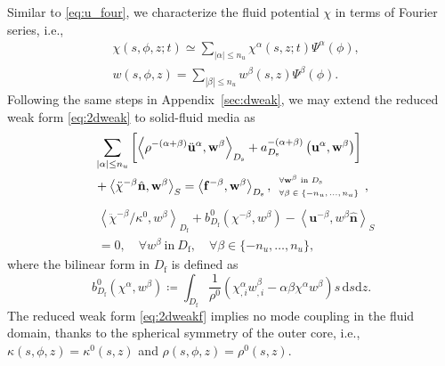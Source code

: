 \documentclass[extra]{gji}
\begin{document}
Similar to \eqref{eq:u_four}, we characterize the fluid potential $\chi$
in terms of Fourier series, i.e.,
\begin{align}
  &\chi\left(s,\phi,z;t\right) \simeq \sum_{|\alpha|\le n_u} 
  \chi^\alpha\left(s,z;t\right)\Psi^\alpha\left(\phi\right),\\[.5em]
  &w\left(s,\phi,z\right) =\sum_{|\beta|\le n_u} 
  w^\beta\left(s,z\right)\Psi^\beta\left(\phi\right).
\end{align}
Following the same steps in Appendix~\ref{sec:dweak}, we may extend 
the reduced weak form \eqref{eq:2dweak} to solid-fluid media as
\begin{equation}
  \begin{alignedat}{1}
    &\sum_{|\alpha|\le n_u} \left[ 
    \left\langle \rho^{-\left(\alpha+\beta\right)}
    \ddot{\mathbf{u}}^\alpha,\mathbf{w}^\beta \right\rangle _{D_\text{s}}
    + a_{D_\text{s}}^{-\left(\alpha+\beta\right)}
    \left(\mathbf{u}^\alpha,\mathbf{w}^\beta\right)\right] \\
    &+\left\langle \ddot{\chi}^{-\beta}\hat{\mathbf{n}},
    \mathbf{w}^\beta \right\rangle _{S}
    =\left\langle \mathbf{f}^{-\beta},\mathbf{w}^\beta \right\rangle 
    _{D_\text{s}}, 
    {\scriptsize
    \begin{array}{l}
      \forall \mathbf{w}^\beta\ \text{in}\ D_\text{s} \\[.3em]
      \forall \beta\in \{-n_u,...,n_u\}
    \end{array}
    },
  \end{alignedat}
\end{equation}
\begin{equation}
  \begin{alignedat}{1}
    & \left\langle 
    \ddot{\chi}^{-\beta}\Big/\kappa^{0}, w^\beta
    \right\rangle _{D_\text{f}}
    + b^0_{D_\text{f}}
    \left(\chi^{-\beta},w^\beta\right) 
    -\left\langle \mathbf{u}^{-\beta}, w^\beta \hat{\mathbf{n}}
    \right\rangle _{S}
    \\&=0, \quad \forall w^\beta\ \text{in}\ D_\text{f},
    \quad \forall \beta\in \{-n_u,\dots,n_u\},
  \end{alignedat}
  \label{eq:2dweakf}
\end{equation}
where the bilinear form in $D_\text{f}$ is defined as
\begin{equation}
  b^0_{D_\text{f}}\left(\chi^{\alpha},w^\beta\right) \coloneqq
  \int_{D_\text{f}} \frac{1}{\rho^0}
  \left(\chi^{\alpha}_{,i} w^{\beta}_{,i} -
  \alpha\beta \chi^{\alpha} w^{\beta}\right) s\,\text{d}s\text{d}z.
\end{equation}
The reduced weak form \eqref{eq:2dweakf} implies no mode coupling 
in the fluid domain, thanks to the spherical symmetry of 
the outer core, i.e., 
$\kappa\left(s,\phi,z\right)=\kappa^0\left(s,z\right)$ and $\rho\left(s,\phi,z\right)=\rho^0\left(s,z\right)$.
\end{document}
